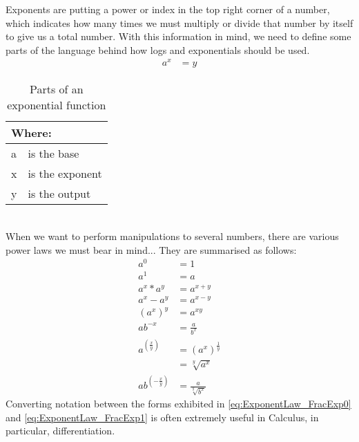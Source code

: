 Exponents are putting a power or index in the top right corner of a number,
which indicates how many times we must multiply or divide that number by
itself to give us a total number. With this information in mind, we need to
define some parts of the language  behind how logs and exponentials should be
used.
\begin{align}
  {a}^{x} & = y
  \label{eq:ExponentialForm}
\end{align}
\begin{table}[!hbt]
\label{tab:PartsOfAnExponential}
\begin{tabularx}{\linewidth}{| l X |}
\hline
\multicolumn{2}{|l|}{Where:} \\
\hline \hline
a & is the base\\
x & is the exponent\\
y & is the output\\
\hline
\end{tabularx}
\caption{Parts of an exponential function}
\end{table}
\\
When we want to perform manipulations to several numbers, there are various
power laws we must bear in mind... They are summarised as follows:
\begin{align}
  {a}^{0}               & = 1 \label{eq:ExponentLaw_Power0} \\
  {a}^{1}               & = a \label{eq:ExponentLaw_Power1} \\
  {a}^{x} * {a}^{y}     & = {a}^{x+y} \label{eq:ExponentLaw_AddExps} \\
  {a}^{x} - {a}^{y}     & = {a}^{x-y} \label{eq:ExponentLaw_SubExps} \\
  {({a}^{x})}^{y}       & = {a}^{xy} \label{eq:ExponentLaw_MultExps} \\
  a{b}^{-x}             & = \frac{a}{{b}^{x}} \label{eq:ExponentLaw_NegExp} \\
  {a}^{(\frac{x}{y})}   & = {({a}^{x})}^{\frac{1}{y}}
                            \label{eq:ExponentLaw_FracExp0} \\
                        & = \sqrt[y]{{a}^{x}} \label{eq:ExponentLaw_FracExp1}\\
  a{b}^{(-\frac{x}{y})} & = \frac{a}{\sqrt[y]{{b}^{x}}}
\end{align}
Converting notation between the forms exhibited in
\ref{eq:ExponentLaw_FracExp0} and \ref{eq:ExponentLaw_FracExp1} is often
extremely useful in Calculus, in particular, differentiation.

